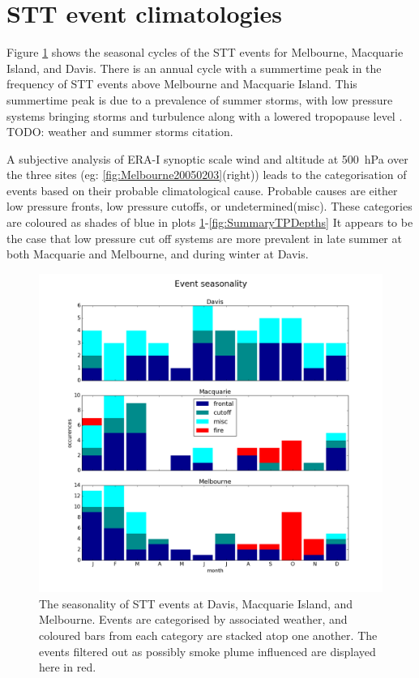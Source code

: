 \documentclass{article}
\begin{document}
\section{STT event climatologies}

  Figure \ref{fig:SummarySeasonality} shows the seasonal cycles of the STT events for Melbourne, Macquarie Island, and Davis. 
  There is an annual cycle with a summertime peak in the frequency of STT events above Melbourne and Macquarie Island.
  This summertime peak is due to a prevalence of summer storms, with low pressure systems bringing storms and turbulence along with a lowered tropopause level \citep{Reutter2015}. TODO: weather and summer storms citation.
  
  A subjective analysis of ERA-I synoptic scale wind and altitude at 500~hPa over the three sites (eg: \ref{fig:Melbourne20050203}(right)) leads to the categorisation of events based on their probable climatological cause.
  Probable causes are either low pressure fronts, low pressure cutoffs, or undetermined(misc).
  These categories are coloured as shades of blue in plots \ref{fig:SummarySeasonality}-\ref{fig:SummaryTPDepths}
  It appears to be the case that low pressure cut off systems are more prevalent in late summer at both Macquarie and Melbourne, and during winter at Davis.

  \begin{figure}[!htbp]
    \begin{center}
    \includegraphics[width=1.0\columnwidth]{figures/summary_season.png}
    \caption{The seasonality of STT events at Davis, Macquarie Island, and Melbourne.
    Events are categorised by associated weather, and coloured bars from each category are stacked atop one another.
    The events filtered out as possibly smoke plume influenced are displayed here in red.}
    \label{fig:SummarySeasonality}
    \end{center}
  \end{figure}
  
\end{document}
